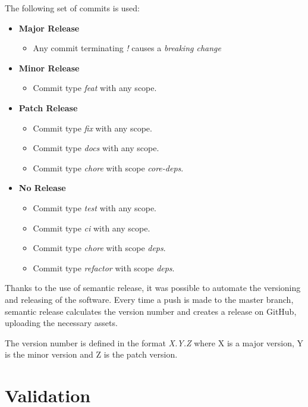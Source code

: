 \documentclass[12pt,a4paper,openright,twoside]{book}
\begin{document}
The following set of commits is used:
\begin{itemize}
  \item \textbf{Major Release} 
  \begin{itemize}
    \item Any commit terminating \textit{!} causes a \emph{breaking change}
  \end{itemize}

  \item \textbf{Minor Release} 
  \begin{itemize}
    \item Commit type \emph{feat} with any scope.
  \end{itemize}

  \item \textbf{Patch Release} 
  \begin{itemize}
    \item Commit type \emph{fix} with any scope.
    \item Commit type \emph{docs} with any scope.
    \item Commit type \emph{chore} with scope \textit{core-deps}.
  \end{itemize}

  \item \textbf{No Release} 
  \begin{itemize}
    \item Commit type \emph{test} with any scope.
    \item Commit type \emph{ci} with any scope.
    \item Commit type \emph{chore} with scope \textit{deps}.
    \item Commit type \emph{refactor} with scope \textit{deps}.
  \end{itemize}
\end{itemize}

Thanks to the use of semantic release, it was possible to automate the versioning and releasing of the software. 
Every time a push is made to the master branch, semantic release calculates the version number and creates a release on GitHub, uploading the necessary assets.

The version number is defined in the format \emph{X.Y.Z} where X is a major version, Y is the minor version and Z is the patch version.

\chapter{Validation}
\end{document}
